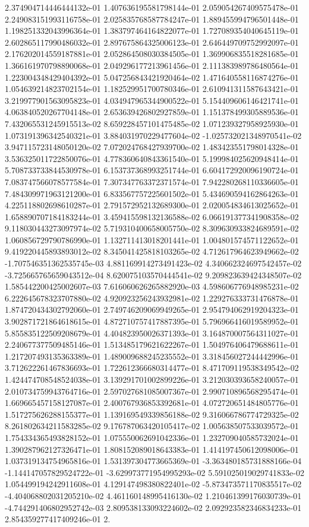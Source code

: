 2.374904714446444132e-01	1.407636195581798144e-01	2.059054267409575478e-01	2.249083151993116758e-01	2.025835768587784247e-01	1.889455994796501448e-01	1.198251332043996364e-01	1.383797464164822077e-01	1.727089354040645119e-01	2.602865117990486032e-01	2.897675864325006123e-01	2.646449709752992097e-01	2.176202014559187881e-01	2.052864508030384505e-01	1.369906835518281685e-01	1.366161970798890068e-01	2.049296177213961456e-01	2.111383989786480564e-01	1.223004348429404392e-01	5.047256843421920464e-02	1.471640558116874276e-01	1.054639214823702154e-01	1.182529951700780346e-01	2.610941311587643421e-01	3.219977901563095823e-01	4.034947965344900522e-01	5.154409606146421741e-01	4.063840520267704148e-01	2.653639426802927859e-01	1.151378499305889536e-01	7.432065531245915513e-02	8.659228457101475485e-02	1.071239327958925930e-01	1.073191396342540321e-01	3.884031970229477604e-02	-1.025732021348970541e-02	3.947115723148050120e-02	7.072024768427939700e-02	1.483423551798014328e-01	3.536325011722850076e-01	4.778360640843361540e-01	5.199984025620948414e-01	5.708733733844530978e-01	6.153737368993251744e-01	6.604172920096190724e-01	7.083747566078577584e-01	7.307347763372371574e-01	7.942280268110336605e-01	7.484309971963121200e-01	6.833567757225601502e-01	5.434690594162864263e-01	4.225118802698610287e-01	2.791572952132689300e-01	2.020054834613025652e-01	1.658890707184183244e-01	3.459415598132136588e-02	6.066191377341908358e-02	9.118030443273097974e-02	5.719310400658005750e-02	8.309630933824689591e-02	1.060856729790786990e-01	1.132711413018201441e-01	1.004801574571122652e-01	9.419220445893893012e-02	8.345041425818103265e-02	4.712617964623949662e-02	-1.707546351362535745e-03	4.881169914273491423e-02	4.340662324697542457e-02	-3.725665765659043512e-04	8.620075103570444541e-02	9.209823639424348507e-02	1.585442200425002607e-03	7.616060626265882920e-03	4.598606776948985231e-02	6.222645678323707880e-02	4.920923256243932981e-02	1.229276333731476878e-01	1.874720434302792060e-01	2.749746209069949265e-01	2.954794062919204323e-01	3.902871721864618615e-01	4.872710757417887395e-01	5.796966416019589952e-01	5.855835122509208679e-01	4.404823950026371393e-01	3.164870007564311027e-01	2.240677377509485146e-01	1.513485179621622267e-01	1.504976406479688611e-01	1.217207493135363389e-01	1.489009688245235552e-01	3.318456027244442996e-01	3.712622261467836693e-01	1.722612366680314477e-01	8.471709119538349542e-02	1.424474708548524038e-01	3.139291701002899226e-01	3.212030393658240057e-01	2.010734759943764716e-01	2.597027681085007367e-01	2.990710896568295474e-01	1.669665457158127087e-01	2.400767936853392681e-01	4.072720651484805776e-01	1.517275626288155377e-01	1.139169549339856188e-02	9.316066786774729325e-02	8.261802634211583285e-02	9.176787063420105417e-02	1.005638507533039572e-01	1.754334365493828152e-01	1.075550062691042336e-01	1.232709040585732024e-01	1.390287962127326471e-01	1.808152089018643383e-01	1.414197450612098006e-01	1.037319134754965816e-01	1.531397304773665369e-01	-3.363480185731888166e-04	-1.144147057829524722e-01	-3.629973771954995293e-02	5.591025019029741833e-02	1.054499194242911608e-01	4.129147498380822401e-02	-5.873473571170835517e-02	-4.404068802031205210e-02	4.461160148995416130e-02	1.210461399176030739e-01	-4.744291406802952742e-03	2.809538133093224602e-02	2.092923582346834233e-01	2.854359277417409246e-01	2.